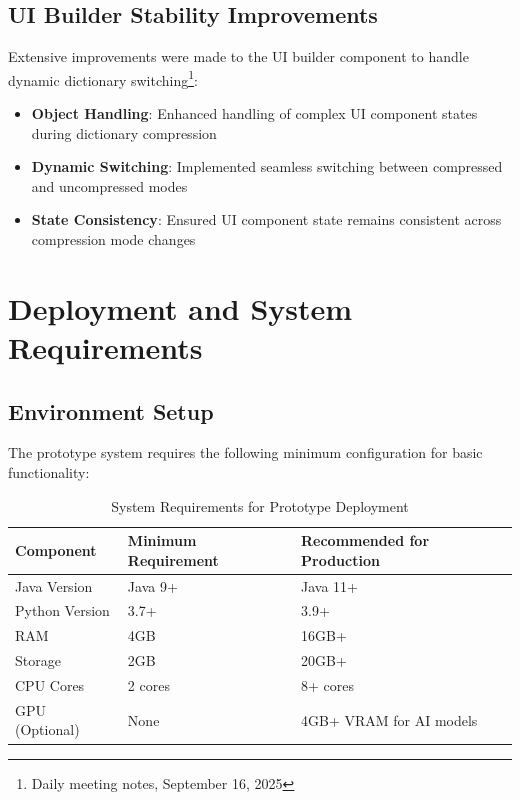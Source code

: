 \documentclass[12pt,a4paper]{article}
\begin{document}
\subsection{UI Builder Stability Improvements}

Extensive improvements were made to the UI builder component to handle dynamic dictionary switching\footnote{Daily meeting notes, September 16, 2025}:

\begin{itemize}
    \item \textbf{Object Handling}: Enhanced handling of complex UI component states during dictionary compression
    \item \textbf{Dynamic Switching}: Implemented seamless switching between compressed and uncompressed modes
    \item \textbf{State Consistency}: Ensured UI component state remains consistent across compression mode changes
\end{itemize}

\section{Deployment and System Requirements}
\label{annex:deployment}

\subsection{Environment Setup}

The prototype system requires the following minimum configuration for basic functionality:

\begin{table}[H]
\centering
\begin{tabular}{|l|l|l|}
\hline
\textbf{Component} & \textbf{Minimum Requirement} & \textbf{Recommended for Production} \\
\hline
Java Version & Java 9+ & Java 11+ \\
Python Version & 3.7+ & 3.9+ \\
RAM & 4GB & 16GB+ \\
Storage & 2GB & 20GB+ \\
CPU Cores & 2 cores & 8+ cores \\
GPU (Optional) & None & 4GB+ VRAM for AI models \\
\hline
\end{tabular}
\caption{System Requirements for Prototype Deployment}
\label{tab:system-requirements}
\end{table}
\end{document}
